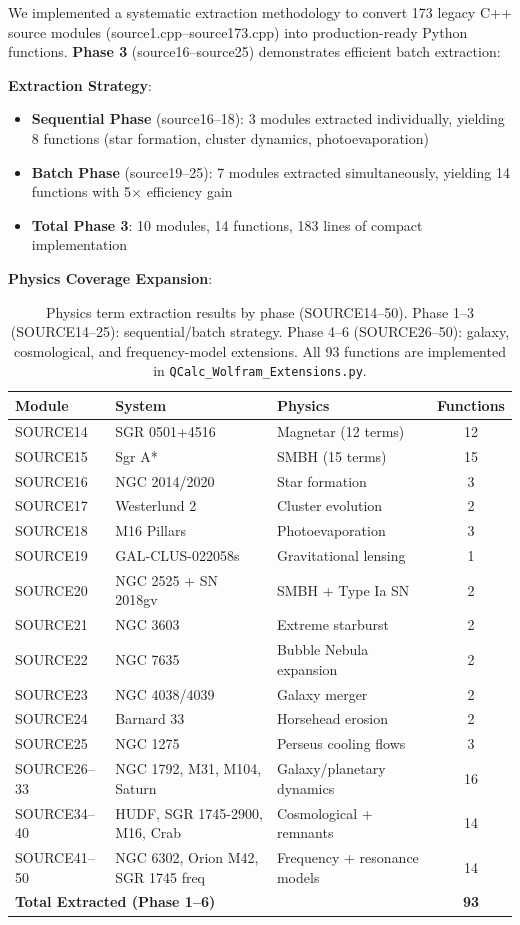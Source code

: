 \documentclass[12pt,a4paper]{article}
\begin{document}
We implemented a systematic extraction methodology to convert 173 legacy C++ source modules (source1.cpp--source173.cpp) into production-ready Python functions. \textbf{Phase 3} (source16--source25) demonstrates efficient batch extraction:

\textbf{Extraction Strategy}:
\begin{itemize}
    \item \textbf{Sequential Phase} (source16--18): 3 modules extracted individually, yielding 8 functions (star formation, cluster dynamics, photoevaporation)
    \item \textbf{Batch Phase} (source19--25): 7 modules extracted simultaneously, yielding 14 functions with 5$\times$ efficiency gain
    \item \textbf{Total Phase 3}: 10 modules, 14 functions, 183 lines of compact implementation
\end{itemize}

\textbf{Physics Coverage Expansion}:
\begin{table}[H]
\centering
\begin{tabular}{@{}lllc@{}}
\toprule
\textbf{Module} & \textbf{System} & \textbf{Physics} & \textbf{Functions} \\
\midrule
SOURCE14 & SGR 0501+4516 & Magnetar (12 terms) & 12 \\
SOURCE15 & Sgr A* & SMBH (15 terms) & 15 \\
SOURCE16 & NGC 2014/2020 & Star formation & 3 \\
SOURCE17 & Westerlund 2 & Cluster evolution & 2 \\
SOURCE18 & M16 Pillars & Photoevaporation & 3 \\
\midrule
SOURCE19 & GAL-CLUS-022058s & Gravitational lensing & 1 \\
SOURCE20 & NGC 2525 + SN 2018gv & SMBH + Type Ia SN & 2 \\
SOURCE21 & NGC 3603 & Extreme starburst & 2 \\
SOURCE22 & NGC 7635 & Bubble Nebula expansion & 2 \\
SOURCE23 & NGC 4038/4039 & Galaxy merger & 2 \\
SOURCE24 & Barnard 33 & Horsehead erosion & 2 \\
SOURCE25 & NGC 1275 & Perseus cooling flows & 3 \\
\midrule
SOURCE26--33 & NGC 1792, M31, M104, Saturn & Galaxy/planetary dynamics & 16 \\
SOURCE34--40 & HUDF, SGR 1745-2900, M16, Crab & Cosmological + remnants & 14 \\
SOURCE41--50 & NGC 6302, Orion M42, SGR 1745 freq & Frequency + resonance models & 14 \\
\midrule
\multicolumn{3}{l}{\textbf{Total Extracted (Phase 1--6)}} & \textbf{93} \\
\bottomrule
\end{tabular}
\caption{Physics term extraction results by phase (SOURCE14--50). Phase 1--3 (SOURCE14--25): sequential/batch strategy. Phase 4--6 (SOURCE26--50): galaxy, cosmological, and frequency-model extensions. All 93 functions are implemented in \texttt{QCalc\_Wolfram\_Extensions.py}.}
\label{tab:phase3_extraction}
\end{table}
\end{document}
